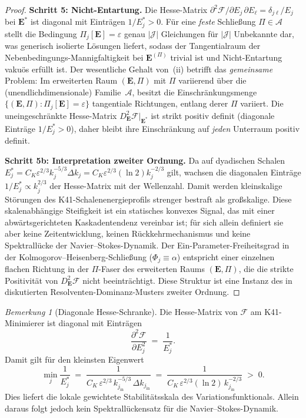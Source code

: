\documentclass[12pt,a4paper]{article}
\theoremstyle{definition}
\theoremstyle{plain}
\theoremstyle{remark}
\newtheorem{remark}[definition]{Bemerkung}
\begin{document}
\begin{proof}
\textbf{Schritt 5: Nicht-Entartung.}\;
Die Hesse-Matrix $\partial^2 \mathcal{F}/\partial E_j\,\partial E_\ell
= \delta_{j\ell}/E_j$ bei $\mathbf{E}^*$ ist diagonal mit Einträgen
$1/E_j^* > 0$. Für eine \emph{feste} Schließung $\Pi \in \mathscr{A}$ stellt die
Bedingung $\Pi_j[\mathbf{E}] = \varepsilon$ genau $|\mathcal{J}|$
Gleichungen für $|\mathcal{J}|$ Unbekannte dar, was generisch isolierte
Lösungen liefert, sodass der Tangentialraum der Nebenbedingungs-Mannigfaltigkeit bei
$\mathbf{E}^{(\Pi)}$ trivial ist und Nicht-Entartung vakuös erfüllt ist.
Der wesentliche Gehalt von~(ii) betrifft das \emph{gemeinsame} Problem: Im
erweiterten Raum $(\mathbf{E}, \Pi)$ mit $\Pi$ variierend über die
(unendlichdimensionale) Familie~$\mathscr{A}$, besitzt die Einschränkungsmenge
$\{(\mathbf{E}, \Pi) : \Pi_j[\mathbf{E}] = \varepsilon\}$ tangentiale
Richtungen, entlang derer $\Pi$ variiert. Die uneingeschränkte Hesse-Matrix
$D^2_{\mathbf{E}}\mathcal{F}|_{\mathbf{E}^*}$ ist strikt positiv
definit (diagonale Einträge $1/E_j^* > 0$), daher bleibt ihre Einschränkung auf
\emph{jeden} Unterraum positiv definit.

\medskip
\noindent\textbf{Schritt 5b: Interpretation zweiter Ordnung.}\;
Da auf dyadischen Schalen
$E_j^* = C_K\varepsilon^{2/3}k_j^{-5/3}\Delta k_j
      = C_K\varepsilon^{2/3}(\ln 2)k_j^{-2/3}$ gilt,
wachsen die diagonalen Einträge $1/E_j^* \propto k_j^{2/3}$ der
Hesse-Matrix mit der Wellenzahl. Damit werden kleinskalige Störungen des
K41-Schalenenergieprofils strenger bestraft als großskalige. Diese skalenabhängige
Steifigkeit ist ein statisches konvexes Signal, das mit einer
abwärtsgerichteten Kaskadentendenz vereinbar ist; für sich allein definiert
sie aber keine Zeitentwicklung, keinen Rückkehrmechanismus und keine
Spektrallücke der Navier--Stokes-Dynamik. Der Ein-Parameter-Freiheitsgrad in der Kolmogorov--Heisenberg-Schließung ($\Phi_j \equiv \alpha$)
entspricht einer einzelnen flachen Richtung in der $\Pi$-Faser des
erweiterten Raums $(\mathbf{E}, \Pi)$, die die strikte
Positivität von $D^2_{\mathbf{E}}\mathcal{F}$ nicht beeinträchtigt. Diese Struktur ist eine
Instanz des in~\cite{FST-Unified2026} diskutierten Resolventen-Dominanz-Musters zweiter Ordnung.
\end{proof}

\begin{remark}[Diagonale Hesse-Schranke]\label{rem:hessian}
Die Hesse-Matrix von $\mathcal{F}$ am K41-Minimierer ist diagonal mit Einträgen
\[
  \frac{\partial^2\mathcal{F}}{\partial E_j^2}
  \;=\; \frac{1}{E_j^*}.
\]
Damit gilt für den kleinsten Eigenwert
\[
  \min_j\frac{1}{E_j^*}
  \;=\;
  \frac{1}{C_K\,\varepsilon^{2/3}\,k_{j_{\mathrm{in}}}^{-5/3}\,
  \Delta k_{j_{\mathrm{in}}}}
  \;=\;
  \frac{1}{C_K\,\varepsilon^{2/3}(\ln 2)\,
  k_{j_{\mathrm{in}}}^{-2/3}}
  \;>\; 0.
\]
Dies liefert die lokale gewichtete Stabilitätsskala des Variationsfunktionals.
Allein daraus folgt jedoch kein Spektrallückensatz für die
Navier--Stokes-Dynamik.
\end{remark}
\end{document}
